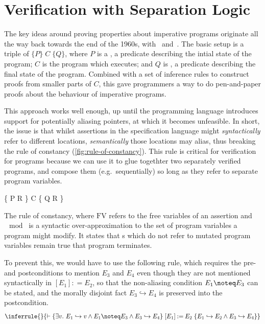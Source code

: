 \section{Verification with Separation Logic}

The key ideas around proving properties about imperative programs originate all
the way back towards the end of the 1960s, with~\citeauthor{floyd1993assigning}
and~\citeauthor{hoare1969axiomatic}. The basic setup is a triple of
$\{P\} \;C \; \{Q\}$, where $P$ is a , a predicate describing the
intial state of the program; $C$ is the program which executes; and $Q$ is
, a predicate describing the final state of the program.
Combined with a set of inference rules to construct proofs from smaller parts
of $C$, this gave programmers a way to do pen-and-paper proofs about the
behaviour of imperative programs.

This approach works well enough, up until the programming language introduces
support for potentially aliasing pointers, at which it becomes
unfeasible. In short, the issue is that
whilst assertions in the specification language might \emph{syntactically}
refer to different locations, \emph{semantically} those locations may alias,
thus breaking the rule of constancy (\cref{fig:rule-of-constancy}). This rule
is critical for  verification for programs because we can use it
to glue togethter two separately verified programs, and compose them (e.g.\
sequentially) so long as they refer to separate program variables.

\begin{marginfigure}
  \begin{mathpar}
                {\vdash{} \{ P \wedge{} R \} \; C \; \{ Q \wedge{} R \}}
  \end{mathpar}
  \caption{The rule of constancy, where $\mathrm{FV}$ refers to the free
      variables of an assertion and $\mod{}$ is a syntactic
      over-approximation to the set of program variables a program might
      modify. It states that \kl{precondition}s which do not refer to mutated
      program variables remain true that program terminates.}\label{fig:rule-of-constancy}
\end{marginfigure}

To prevent this, we would have to use the following rule, which requires the
pre- and postconditions to mention $E_3$ and $E_4$ even though they are not
mentioned syntactically in $ [ E_1 ] \mathbin{{:}{=}} E_2$, so that the
non-aliasing condition $E_1 \noteq E_3$ can be stated, and the morally disjoint
fact $E_3 \hookrightarrow{} E_4$ is preserved into the postcondition.%
\[
    \inferrule{}{\vdash{}
        \{ \exists{} v.\ E_1 \hookrightarrow{} v \wedge{} E_1 \noteq E_3 \wedge{} E_3 \hookrightarrow{} E_4 \}
        \; [ E_1 ] \mathbin{{:}{=}} E_2 \;
        \{ E_1 \hookrightarrow{} E_2 \wedge{} E_3 \hookrightarrow{} E_4 \} }
\]

